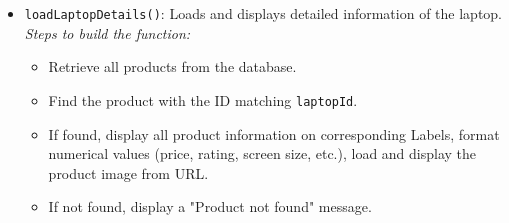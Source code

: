\documentclass{article}
\begin{document}
\begin{itemize}
\begin{itemize}
\begin{itemize}
        \end{itemize}
        \item \texttt{loadLaptopDetails()}: Loads and displays detailed information of the laptop.
        \subitem \textit{Steps to build the function:}
        \begin{itemize}
            \item Retrieve all products from the database.
            \item Find the product with the ID matching \texttt{laptopId}.
            \item If found, display all product information on corresponding Labels, format numerical values (price, rating, screen size, etc.), load and display the product image from URL.
            \item If not found, display a "Product not found" message.
        \end{itemize}
    \end{itemize}
\end{itemize}
\end{document}
